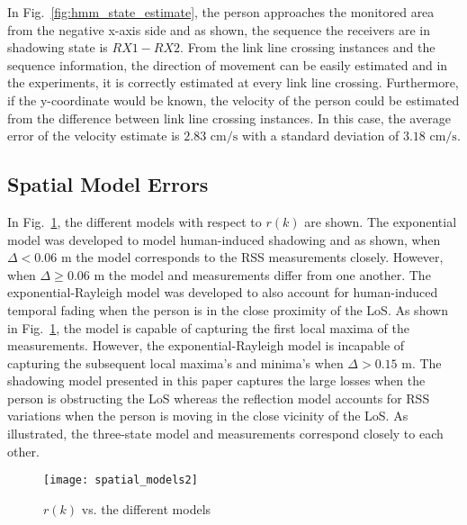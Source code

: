 \documentclass[journal, 10pt, twocolumn, balance]{IEEEtran}
\begin{document}
In Fig.~\ref{fig:hmm_state_estimate}, the person approaches the monitored area from the negative x-axis side and as shown, the sequence the receivers are in shadowing state is $RX 1 - RX 2$. From the link line crossing instances and the sequence information, the direction of movement can be easily estimated and in the experiments, it is correctly estimated at every link line crossing. Furthermore, if the y-coordinate would be known, the velocity of the person could be estimated from the difference between link line crossing instances. In this case, the average error of the velocity estimate is $2.83 \text{ cm/s}$ with a standard deviation of $3.18 \text{ cm/s}$. 


\subsection{Spatial Model Errors}\label{sec:spatial_model_error}


In Fig.~\ref{fig:model_comparison}, the different models with respect to $r(k)$ are shown. The exponential model was developed to model human-induced shadowing and as shown, when $\Delta < 0.06 \text{ m}$ the model corresponds to the RSS measurements closely. However, when $\Delta \geq 0.06 \text{ m}$ the model and measurements differ from one another. The exponential-Rayleigh model was developed to also account for human-induced temporal fading when the person is in the close proximity of the LoS. As shown in Fig.~\ref{fig:model_comparison}, the model is capable of capturing the first local maxima of the measurements. However, the exponential-Rayleigh model is incapable of capturing the subsequent local maxima’s and minima’s when $\Delta > 0.15 \text{ m}$. The shadowing model presented in this paper captures the large losses when the person is obstructing the LoS whereas the reflection model accounts for RSS variations when the person is moving in the close vicinity of the LoS. As illustrated, the three-state model and measurements correspond closely to each other.

\begin{figure}[!t]
\begin{centering}
\texttt{[image: spatial\_models2]}
\caption{$r(k)$ vs. the different models} 
\label{fig:model_comparison}
\end{centering}
\end{figure}
\end{document}
